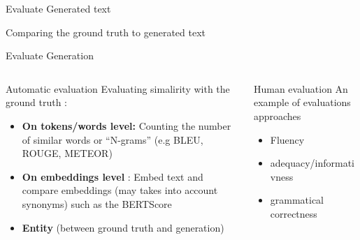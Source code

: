 \documentclass[10pt,aspectratio=169]{beamer}
\begin{document}
\begin{frame}{Evaluate Generated text}
    \begin{block}{Comparing the ground truth to generated text}
        
    \end{block}
    
\end{frame}
\begin{frame}{Evaluate Generation}
    \begin{columns}
        \begin{column}{0.6\textwidth}
            \begin{block}{Automatic evaluation}
                Evaluating simalirity with the ground truth :
                \begin{itemize}
                    \item \textbf{On tokens/words level: } Counting the number of similar words or ``N-grams'' (e.g BLEU, ROUGE, METEOR)
    
                    \item \textbf{On embeddings level} : Embed text and compare embeddings (may takes into account synonyms) such as the BERTScore\cite{}
                    \item \textbf{Entity} (between ground truth and generation)
                \end{itemize}
                
            \end{block}     
        \end{column}
        \begin{column}{0.4\textwidth}
            \begin{block}{Human evaluation}
                An example of evaluations approaches \cite{Thorleiksdttir2021UnderstandingHPb}
                \begin{itemize}
                    \item Fluency 
                    \item adequacy/informativness
                    \item grammatical correctness
                \end{itemize}
                
            \end{block}
            
        \end{column}
    \end{columns}

\end{frame}
\end{document}
